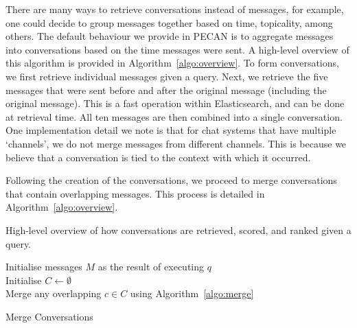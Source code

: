 There are many ways to retrieve conversations instead of messages, for example, one could decide to group messages together based on time, topicality, among others. The default behaviour we provide in PECAN is to aggregate messages into conversations based on the time messages were sent. A high-level overview of this algorithm is provided in Algorithm~\ref{algo:overview}. To form conversations, we first retrieve individual messages given a query. Next, we retrieve the five messages that were sent before and after the original message (including the original message). This is a fast operation within Elasticsearch, and can be done at retrieval time. All ten messages are then combined into a single conversation. One implementation detail we note is that for chat systems that have multiple `channels', we do not merge messages from different channels. This is because we believe that a conversation is tied to the context with which it occurred.

Following the creation of the conversations, we proceed to merge conversations that contain overlapping messages. This process is detailed in Algorithm~\ref{algo:overview}.



\begin{algorithm}
	\SetAlgoLined
	\caption{High-level overview of how conversations are retrieved, scored, and ranked given a query.}
	\label{algo:overview}
	Initialise messages $M$ as the result of executing $q$\\
	Initialise $C\gets\emptyset$\\ 
    Merge any overlapping $c\in C$ using Algorithm~\ref{algo:merge}\\
	\end{algorithm}
		
\begin{algorithm}
	\SetAlgoLined
	\caption{Merge Conversations }
	\label{algo:merge}
\end{algorithm}		
		
